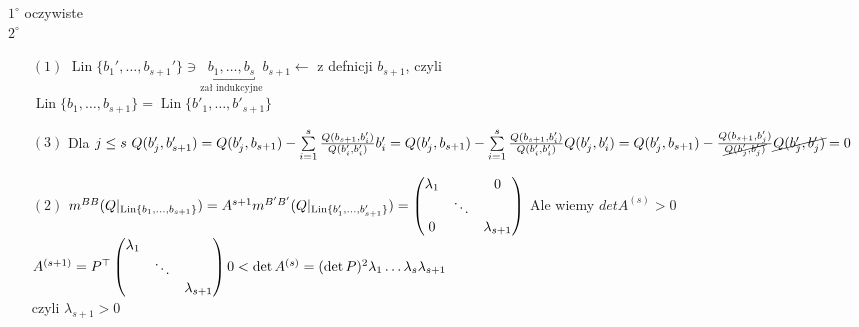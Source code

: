 \begin{dd}
\begin{itemize}
\begin{enumerate}
                            \end{enumerate} 
                            $1^\circ$ oczywiste \\ 
                            $2^\circ$ 
                            \begin{itemize} 
                                \item[$(1)$]$\operatorname{Lin}\{b_1',\ldots,b_{s+1}'\}\ni
                                    \underbracket{b_1,\ldots,b_s}_{\text{zał indukcyjne}}
                                    b_{s+1} \leftarrow$ z defnicji $b_{s+1}$, czyli \\ 
                                    $\operatorname{Lin}\{b_1,\ldots,b_{s+1}\}= 
                                    \operatorname{Lin}\{b'_1,\ldots,b'_{s+1}\}$ 
                                \item[$(3)$] Dla $j \le s \ Q(b_j',b_{s+1}') = 
                                    Q(b_j',b_{s+1}) - \sum\limits_{i=1}^s
                                    \frac{Q(b_{s+1},b_i')}{Q(b_i',b_i')}b_i'=Q(b_j',b_{s+1
                                    })-\sum\limits_{i=1}^s \frac{Q(b_{s+1},b_i')}{Q(b_i',
                                    b_i')}Q(b_j',b_i')=Q(b_j',b_{s+1})-\frac{Q(b_{s+1},
                                    b_j')}{\cancel{Q(b_j',b_j')}} \cancel{Q(b_j',b_j')}=0$
                                \item[$(2)$] $m^{BB} (Q|_{\operatorname{Lin}\{b_1,\ldots,
                                    b_{s+1}\}})=A^{s+1} \\ 
                                    m^{B'B'}(Q|_{\operatorname{Lin}\{b'_1,\ldots,
                                    b'_{s+1}\}})=\begin{pmatrix} \lambda_1 & & 0 \\ 
                                    & \ddots & \\ 0 & & \lambda_{s+1}\end{pmatrix} 
                                    $ Ale wiemy $det A^{(s)} > 0$ \\ 
                                        $A^{(s+1)} = P^\top \begin{pmatrix} \lambda_1 & &
                                            \\ & \ddots & \\& &\lambda_{s+1}\end{pmatrix}
                                    \\ 0 < \det A^{(s)} = (\det P)^2 \lambda_1 \ldots 
                                    \lambda_s \lambda_{s+1}$ \\ czyli $\lambda_{s+1} > 0$

\end{itemize}
\end{itemize}
\end{dd}
